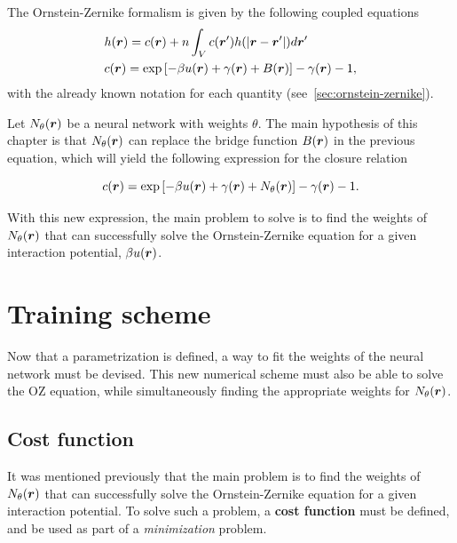 The Ornstein-Zernike formalism is given by the following coupled equations~\cite{hansenTheorySimpleLiquids2013}
\begin{equation}
    \begin{aligned}
         & h(\bm{r}) = c(\bm{r}) +
        n \int_{V}
        c(\bm{r}^{\prime})
        h(\lvert \bm{r} - \bm{r}^{\prime} \rvert)
        d\bm{r}^{\prime} \\
         & c(\bm{r})
        = \exp{\left[
                -  \beta u(\bm{r})
                +  \gamma(\bm{r})
                + B(\bm{r})
                \right]} -
        \gamma(\bm{r})
        - 1 ,
    \end{aligned}
    \label{eq:oz1}
\end{equation}
with the already known notation for each quantity (see~\autoref{sec:ornstein-zernike}).

Let $N_{\theta}(\bm{r})$ be a neural network with weights $\theta$. The main hypothesis
of this chapter is that $N_{\theta}(\bm{r})$ can replace the bridge function $B(\bm{r})$
in the previous equation, which will yield the following expression for
the closure relation

\begin{equation}
    c(\bm{r}) = \exp{\left[
            -  \beta u(\bm{r})
            +  \gamma(\bm{r})
            + N_{\theta}(\bm{r})\right]} -
    \gamma(\bm{r})
    - 1 .
    \label{eq:parametrizacion}
\end{equation}

With this new expression, the main problem to solve is to find the weights
of $N_{\theta}(\bm{r})$ that can successfully solve the Ornstein-Zernike equation
for a given interaction potential, $\beta u(\bm{r})$.


\section{Training scheme}
Now that a parametrization is defined, a way to fit the weights of the neural network must
be devised. This new numerical scheme must also be able to solve the OZ equation, while
simultaneously finding the appropriate weights for $N_{\theta}(\bm{r})$.

\subsection{Cost function}
It was mentioned previously that the main problem is to find the weights of
$N_{\theta}(\bm{r})$ that can successfully solve the Ornstein-Zernike equation
for a given interaction potential.
To solve such a problem, a \textbf{cost function} must be defined, and be used as part of
a \emph{minimization} problem.

